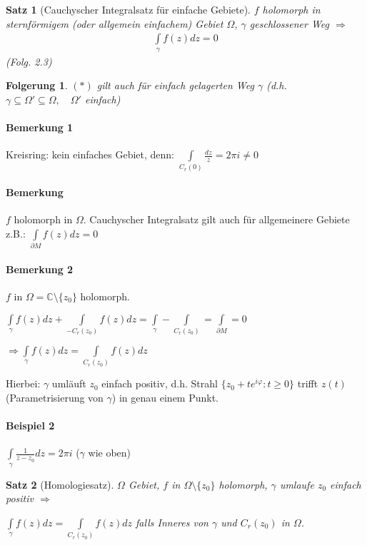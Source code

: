 \documentclass[ngerman,halfparskip]{scrartcl}
\newtheorem*{satz*}{Satz}
\newtheorem{folg}{Folgerung}[section]
\theoremstyle{definition}
\def\C{\mathbb C}
\begin{document}
\begin{satz*}[Cauchyscher Integralsatz für einfache Gebiete]
$f$ holomorph in sternförmigem (oder allgemein einfachem) Gebiet $\Omega$, $\gamma$  geschlossener Weg $\Rightarrow$
\begin{gather*}\tag{$*$}
\int\limits_\gamma f(z)dz=0
\end{gather*}
(Folg. 2.3)
\end{satz*}

\begin{folg}
$(*)$ gilt auch für einfach gelagerten Weg $\gamma$ (d.h. $\gamma \subseteq \Omega'\subseteq \Omega, \quad  \Omega '$ einfach)
\end{folg}

\paragraph{Bemerkung 1} Kreisring: kein einfaches Gebiet, denn: $\int\limits_{C_r(0)}\frac{dz}z=2\pi i \neq 0$

\paragraph*{Bemerkung} $f$ holomorph in $\Omega$. Cauchyscher Integralsatz gilt auch für allgemeinere Gebiete z.B.: $\int\limits_{\partial M} f(z)dz=0$

\paragraph{Bemerkung 2} $f$ in $\Omega=\C \setminus \{z_0\}$ holomorph.

$\int\limits_\gamma f(z)dz +\int\limits_{-C_r(z_0)}f(z)dz=\int\limits_\gamma-\int\limits_{C_r(z_0)}=\int\limits_{\partial M}=0$

$\Rightarrow \boxed{\int\limits _\gamma f(z)dz=\int\limits_{C_r(z_0)}f(z)dz}$

Hierbei: $\gamma$ umläuft $z_0$ einfach positiv, d.h. Strahl $\{z_0+te^{i\varphi}: t\geq 0\}$ trifft $z(t)$ (Parametrisierung von $\gamma$) in genau einem Punkt.


\paragraph{Beispiel 2} $\int\limits_\gamma \frac 1 {z-z_0} dz =2\pi i$  ($\gamma$ wie oben)

\begin{satz*}[Homologiesatz]
$\Omega$ Gebiet, $f$ in $\Omega\setminus \{z_0\} $ holomorph, $\gamma$ umlaufe $z_0$ einfach positiv $\Rightarrow$

$\int\limits_\gamma f(z)dz =\int\limits_{C_r(z_0)}f(z)dz$ falls Inneres von $\gamma$ und $C_r(z_0)$ in $\Omega$.
\end{satz*}
\end{document}
